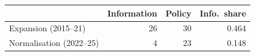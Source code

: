 \begin{tabular}{lrrr}
\toprule
 & Information & Policy & Info.\ share \\
\midrule
Expansion (2015--21) & 26 & 30 & 0.464 \\
Normalisation (2022--25) & 4 & 23 & 0.148 \\
\bottomrule
\end{tabular}
